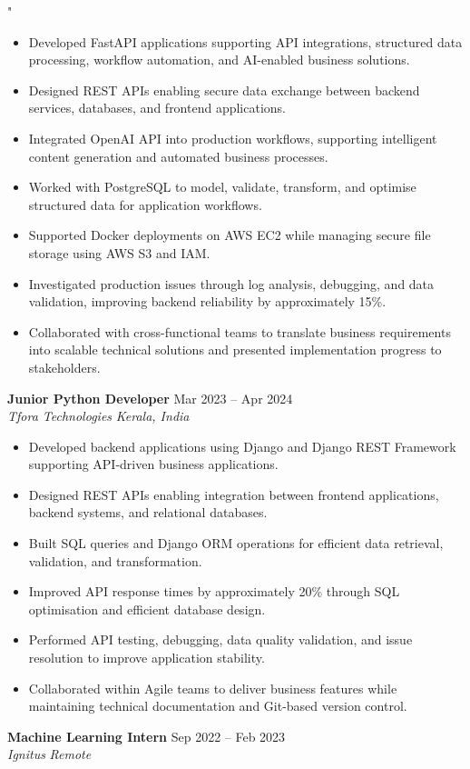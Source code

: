"\documentclass[10pt,a4paper]{article}
\newcommand{\resumeSubheading}[4]{
\textbf{#1} \hfill #2 \\
\textit{#3} \hfill \textit{#4}
}
\begin{document}
\begin{itemize}
\item Developed FastAPI applications supporting API integrations, structured data processing, workflow automation, and AI-enabled business solutions.
\item Designed REST APIs enabling secure data exchange between backend services, databases, and frontend applications.
\item Integrated OpenAI API into production workflows, supporting intelligent content generation and automated business processes.
\item Worked with PostgreSQL to model, validate, transform, and optimise structured data for application workflows.
\item Supported Docker deployments on AWS EC2 while managing secure file storage using AWS S3 and IAM.
\item Investigated production issues through log analysis, debugging, and data validation, improving backend reliability by approximately 15\%.
\item Collaborated with cross-functional teams to translate business requirements into scalable technical solutions and presented implementation progress to stakeholders.
\end{itemize}
\resumeSubheading
{Junior Python Developer}{Mar 2023 -- Apr 2024}
{Tfora Technologies}{Kerala, India}
\begin{itemize}
\item Developed backend applications using Django and Django REST Framework supporting API-driven business applications.
\item Designed REST APIs enabling integration between frontend applications, backend systems, and relational databases.
\item Built SQL queries and Django ORM operations for efficient data retrieval, validation, and transformation.
\item Improved API response times by approximately 20\% through SQL optimisation and efficient database design.
\item Performed API testing, debugging, data quality validation, and issue resolution to improve application stability.
\item Collaborated within Agile teams to deliver business features while maintaining technical documentation and Git-based version control.
\end{itemize}
\resumeSubheading
{Machine Learning Intern}{Sep 2022 -- Feb 2023}
{Ignitus}{Remote}
\end{document}
